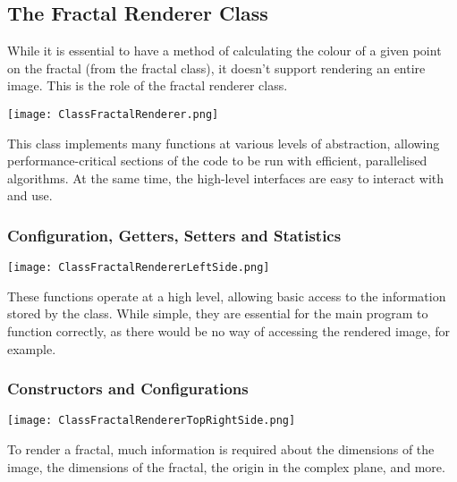 \subsection{The Fractal Renderer Class}

While it is essential to have a method of calculating the colour of a given point on the fractal (from the fractal class), it doesn't support rendering an entire image. This is the role of the fractal renderer class.

\FloatBarrier
\begin{figure*}[htp]
	\centering
	\texttt{[image: ClassFractalRenderer.png]}
\end{figure*}
\FloatBarrier

This class implements many functions at various levels of abstraction, allowing performance-critical sections of the code to be run with efficient, parallelised algorithms. At the same time, the high-level interfaces are easy to interact with and use.

\pagebreak

\subsubsection{Configuration, Getters, Setters and Statistics}

\FloatBarrier
\begin{figure*}[htp]
	\centering
	\texttt{[image: ClassFractalRendererLeftSide.png]}
\end{figure*}
\FloatBarrier

These functions operate at a high level, allowing basic access to the information stored by the class. While simple, they are essential for the main program to function correctly, as there would be no way of accessing the rendered image, for example.

\pagebreak

\subsubsection{Constructors and Configurations}

\FloatBarrier
\begin{figure*}[htp]
	\centering
	\texttt{[image: ClassFractalRendererTopRightSide.png]}
\end{figure*}
\FloatBarrier

To render a fractal, much information is required about the dimensions of the image, the dimensions of the fractal, the origin in the complex plane, and more.

